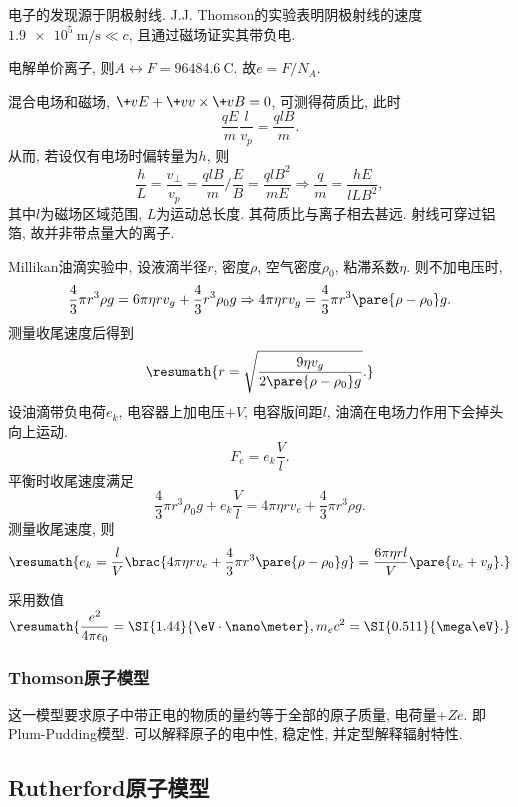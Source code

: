 \documentclass[hidelinks]{ctexart}
\begin{document}
电子的发现源于阴极射线. J.J. Thomson的实验表明阴极射线的速度$\SI{1.9e5}{\meter\per\second}\ll c$, 且通过磁场证实其带负电.
\par
电解单价离子, 则$A\leftrightarrow F = \SI{96484.6}{\coulomb}$. 故$e = F/N_A$.
\par
混合电场和磁场, $\+vE + \+vv\times\+vB = 0$, 可测得荷质比, 此时
\[ \frac{qE}{m}\frac{l}{v_p} = \frac{qlB}{m}. \]
从而, 若设仅有电场时偏转量为$h$, 则
\[ \frac{h}{L} = \frac{v_\perp}{v_p} = \frac{qlB}{m}/\frac{E}{B} = \frac{qlB^2}{mE}\Rightarrow \frac{q}{m} = \frac{hE}{lLB^2}, \]
其中$l$为磁场区域范围, $L$为运动总长度. 其荷质比与离子相去甚远. 射线可穿过铝箔, 故并非带点量大的离子.
\par
Millikan油滴实验中, 设液滴半径$r$, 密度$\rho$, 空气密度$\rho_0$, 粘滞系数$\eta$. 则不加电压时,
\[ \frac{4}{3}\pi r^3\rho g = 6\pi \eta rv_g + \frac{4}{3}r^3\rho_0 g \Rightarrow 4\pi\eta rv_g = \frac{4}{3} \pi r^3 \pare{\rho - \rho_0}g. \]
测量收尾速度后得到
\[ \resumath{r = \sqrt{\frac{9\eta v_g}{2\pare{\rho - \rho_0}g}}.} \]
设油滴带负电荷$e_k$, 电容器上加电压$+V$, 电容版间距$l$, 油滴在电场力作用下会掉头向上运动.
\[ F_e = e_k \frac{V}{l}. \]
平衡时收尾速度满足
\[ \frac{4}{3}\pi r^3\rho_0 g + e_k \frac{V}{l} = 4\pi\eta rv_e + \frac{4}{3}\pi r^3 \rho g. \]
测量收尾速度, 则
\[ \resumath{e_k = \frac{l}{V}\brac{4\pi \eta r v_e + \frac{4}{3}\pi r^3\pare{\rho - \rho_0}g} = \frac{6\pi \eta rl}{V}\pare{v_e + v_g}.} \]
\begin{remark}
    采用数值$\resumath{\displaystyle \frac{e^2}{4\pi\epsilon_0} = \SI{1.44}{\eV\cdot\nano\meter}, m_ec^2 = \SI{0.511}{\mega\eV}.}$
\end{remark}


\subsubsection{Thomson原子模型} %
\label{ssub:thomson原子模型}

这一模型要求原子中带正电的物质的量约等于全部的原子质量, 电荷量$+Ze$. 即Plum-Pudding模型. 可以解释原子的电中性, 稳定性, 并定型解释辐射特性.



\subsection{Rutherford原子模型} %
\label{sub:rutherford原子模型}
\end{document}
